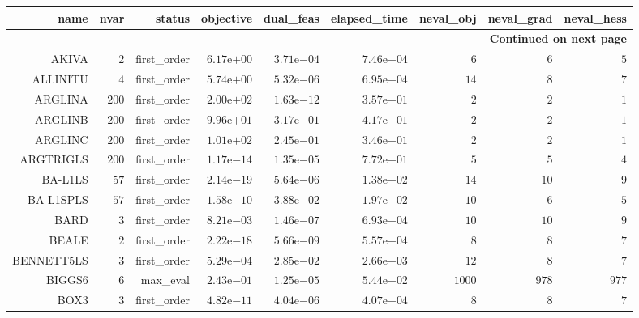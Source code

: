 \begin{longtable}{rrrrrrrrr}
\hline
name & nvar & status & objective & dual\_feas & elapsed\_time & neval\_obj & neval\_grad & neval\_hess \\\hline
\endhead
\hline
\multicolumn{9}{r}{{\bfseries Continued on next page}}\\
\hline
\endfoot
\endlastfoot
AKIVA & \(     2\) & first\_order & \( 6.17\)e\(+00\) & \( 3.71\)e\(-04\) & \( 7.46\)e\(-04\) & \(     6\) & \(     6\) & \(     5\) \\
ALLINITU & \(     4\) & first\_order & \( 5.74\)e\(+00\) & \( 5.32\)e\(-06\) & \( 6.95\)e\(-04\) & \(    14\) & \(     8\) & \(     7\) \\
ARGLINA & \(   200\) & first\_order & \( 2.00\)e\(+02\) & \( 1.63\)e\(-12\) & \( 3.57\)e\(-01\) & \(     2\) & \(     2\) & \(     1\) \\
ARGLINB & \(   200\) & first\_order & \( 9.96\)e\(+01\) & \( 3.17\)e\(-01\) & \( 4.17\)e\(-01\) & \(     2\) & \(     2\) & \(     1\) \\
ARGLINC & \(   200\) & first\_order & \( 1.01\)e\(+02\) & \( 2.45\)e\(-01\) & \( 3.46\)e\(-01\) & \(     2\) & \(     2\) & \(     1\) \\
ARGTRIGLS & \(   200\) & first\_order & \( 1.17\)e\(-14\) & \( 1.35\)e\(-05\) & \( 7.72\)e\(-01\) & \(     5\) & \(     5\) & \(     4\) \\
BA-L1LS & \(    57\) & first\_order & \( 2.14\)e\(-19\) & \( 5.64\)e\(-06\) & \( 1.38\)e\(-02\) & \(    14\) & \(    10\) & \(     9\) \\
BA-L1SPLS & \(    57\) & first\_order & \( 1.58\)e\(-10\) & \( 3.88\)e\(-02\) & \( 1.97\)e\(-02\) & \(    10\) & \(     6\) & \(     5\) \\
BARD & \(     3\) & first\_order & \( 8.21\)e\(-03\) & \( 1.46\)e\(-07\) & \( 6.93\)e\(-04\) & \(    10\) & \(    10\) & \(     9\) \\
BEALE & \(     2\) & first\_order & \( 2.22\)e\(-18\) & \( 5.66\)e\(-09\) & \( 5.57\)e\(-04\) & \(     8\) & \(     8\) & \(     7\) \\
BENNETT5LS & \(     3\) & first\_order & \( 5.29\)e\(-04\) & \( 2.85\)e\(-02\) & \( 2.66\)e\(-03\) & \(    12\) & \(     8\) & \(     7\) \\
BIGGS6 & \(     6\) & max\_eval & \( 2.43\)e\(-01\) & \( 1.25\)e\(-05\) & \( 5.44\)e\(-02\) & \(  1000\) & \(   978\) & \(   977\) \\
BOX3 & \(     3\) & first\_order & \( 4.82\)e\(-11\) & \( 4.04\)e\(-06\) & \( 4.07\)e\(-04\) & \(     8\) & \(     8\) & \(     7\) \\

\end{longtable}

